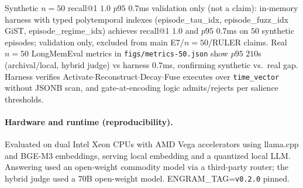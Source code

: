 Synthetic $n{=}50$ recall@1 $1.0$ $p95$ $0.7$ms validation only (not a claim): in-memory harness with typed polytemporal indexes (episode\_tau\_idx, episode\_fuzz\_idx GiST, episode\_regime\_idx) achieves recall@1 $1.0$ and $p95$ $0.7$ms on $50$ synthetic episodes; validation only, excluded from main E7/$n{=}50$/RULER claims. Real $n{=}50$ LongMemEval metrics in \texttt{figs/metrics-50.json} show $p95$ $210$s (archival/local, hybrid judge) vs harness $0.7$ms, confirming synthetic vs.\ real gap. Harness verifies Activate$\cdot$Reconstruct$\cdot$Decay$\cdot$Fuse executes over \texttt{time\_vector} without JSONB scan, and gate-at-encoding logic admits/rejects per salience thresholds.

\paragraph{Hardware and runtime (reproducibility).} Evaluated on dual Intel Xeon CPUs with AMD Vega accelerators using llama.cpp and BGE-M3 embeddings, serving local embedding and a quantized local LLM. Answering used an open-weight commodity model via a third-party router; the hybrid judge used a 70B open-weight model. ENGRAM\_TAG=\texttt{v0.2.0} pinned.